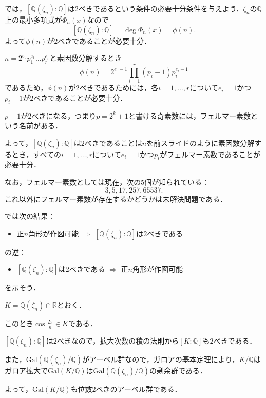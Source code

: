 \documentclass[dvipdfmx,17pt]{beamer}
\theoremstyle{plain}
\newcommand{\Q}{\mathbb{Q}}
\newcommand{\R}{\mathbb{R}}
\begin{document}
\begin{frame}
では，$[\Q(\zeta_n) : \Q]$は$2$べきであるという条件の必要十分条件を与えよう．$\zeta_n$の$\Q$上の最小多項式が$\Phi_n(x)$なので
\[[\Q(\zeta_n) : \Q] = \deg \Phi_n(x) = \phi(n).\]
よって$\phi(n)$が$2$べきであることが必要十分．
\end{frame}

\begin{frame}
$n = 2^{e_0} p_1^{e_1} \dots p_r^{e_r}$と素因数分解するとき
\[\phi(n) = 2^{e_0 - 1} \prod_{i=1}^r (p_i - 1)p_i ^ {e_i - 1} \]
であるため，$\phi(n)$が$2$べきであるためには，各$i = 1, \dots, r$について$e_i = 1$かつ$p_i - 1$が$2$べきであることが必要十分．
\end{frame}

\begin{frame}
$p - 1$が$2$べきになる，つまり$p = 2^k + 1$と書ける奇素数には，フェルマー素数という名前がある．

よって，$[\Q(\zeta_n) : \Q]$は$2$べきであることは$n$を前スライドのように素因数分解するとき，すべての$i = 1, \dots, r$について$e_i = 1$かつ$p_i$がフェルマー素数であることが必要十分．
\end{frame}

\begin{frame}
なお，フェルマー素数としては現在，次の$5$個が知られている：
\[3, 5, 17, 257, 65537.\]
これ以外にフェルマー素数が存在するかどうかは未解決問題である．
\end{frame}

\begin{frame}
では次の結果：
\begin{itemize}
\item 正$n$角形が作図可能 $\Rightarrow$ $[\Q(\zeta_n) : \Q]$は$2$べきである
\end{itemize}
の逆：
\begin{itemize}
\item $[\Q(\zeta_n) : \Q]$は$2$べきである $\Rightarrow$ 正$n$角形が作図可能
\end{itemize}
を示そう．
\end{frame}

\begin{frame}
$K = \Q(\zeta_n) \cap \R$とおく．

このとき$\cos \frac{2 \pi}{n} \in K$である．

$[\Q(\zeta_n) : \Q]$は$2$べきなので，拡大次数の積の法則から$[K : \Q]$も$2$べきである．

また，$\mathrm{Gal}(\Q(\zeta_n)/\Q)$がアーベル群なので，ガロアの基本定理により，$K/\Q$はガロア拡大で$\mathrm{Gal}(K/\Q)$は$\mathrm{Gal}(\Q(\zeta_n)/\Q)$の剰余群である．

よって，$\mathrm{Gal}(K/\Q)$も位数$2$べきのアーベル群である．
\end{frame}
\end{document}
